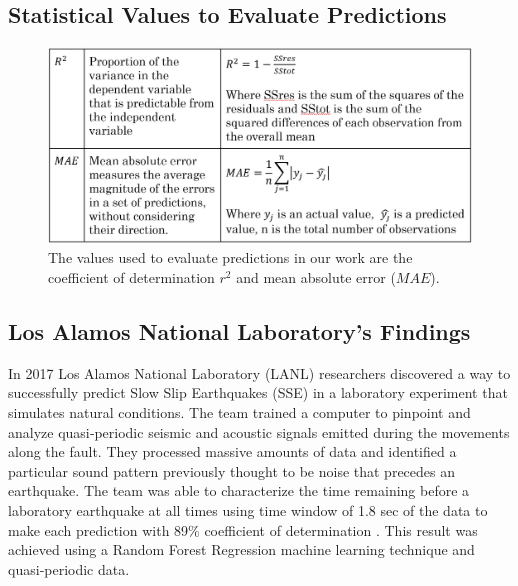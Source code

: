 \documentclass[]{llncs} %
\begin{document}
\subsection{Statistical Values to Evaluate Predictions}
\begin{figure}
	\centering
	\includegraphics[width=.9\linewidth]{background}
	\caption{The values used to evaluate predictions in our work are the coefficient of determination $r^2$ and mean absolute error ($MAE$).}
	\label{fig:background}
\end{figure}

\subsection{Los Alamos National Laboratory's Findings}
In 2017 Los Alamos National Laboratory (LANL) researchers discovered a way to successfully predict Slow Slip Earthquakes (SSE) in a laboratory experiment that simulates natural conditions. The team trained a computer to pinpoint and analyze quasi‐periodic seismic and acoustic signals emitted during the movements along the fault. They processed massive amounts of data and identified a particular sound pattern previously thought to be noise that precedes an earthquake. The team was able to characterize the time remaining before a laboratory earthquake at all times using time window of 1.8 sec of the data to make each prediction with 89\% coefficient of determination \cite{LANLNews}. This result was achieved using a Random Forest Regression machine learning technique and quasi‐periodic data. \par
\end{document}
